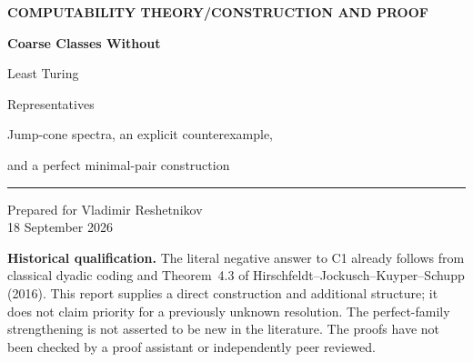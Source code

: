 \documentclass[11pt,a4paper]{article}
\newcommand{\nleT}{\nleq_{\mathrm T}}
\newcommand{\degT}{\operatorname{deg}_{\mathrm T}}
\newcommand{\zero}{\mathbf 0}
\newcommand{\ddeg}{\mathbf d}
\theoremstyle{definition}\newtheorem{definition}[theorem]{Definition}
\theoremstyle{remark}\newtheorem{remark}[theorem]{Remark}
\begin{document}
\begin{titlepage}
\vspace*{12mm}
{\small\sffamily\bfseries\color{navy}COMPUTABILITY THEORY\quad /\quad CONSTRUCTION AND PROOF\par}
\vspace{14mm}
{\Huge\bfseries\color{navy}Coarse Classes Without\par Least Turing\par Representatives\par}
\vspace{8mm}
{\Large Jump-cone spectra, an explicit counterexample,\par and a perfect minimal-pair construction\par}
\vspace{12mm}
\noindent\rule{\textwidth}{0.5pt}
\vspace{4mm}
\noindent Prepared for Vladimir Reshetnikov\\[3pt]
18 September 2026
\vspace{10mm}
\begin{abstract}
We attack C1 in the supplied Turing-degrees research catalogue: must every nonuniform coarse-equivalence class contain a least Turing degree? For the dyadic replication $R_A(n)=A(v_2(n+1))$, we prove that the actual representative spectrum, for either coarse reducibility, is precisely $\{\ddeg:\degT(A)\leq\ddeg'\}$. A finite-extension construction produces two coarse descriptions of $R_A$ with no common noncomputable information, and a synchronized version produces a perfect family of such descriptions. Consequently, when $A\nleT\varnothing'$, the coarse class has no least Turing degree. Taking $A=\varnothing''$ gives the high-degree spectrum; an explicit representative of this same coarse class has degree $\zero'$. In contrast, the effective-dense representative spectrum of $R_A$ is the ordinary upper cone above $\degT(A)$, and has a least element. All construction and spectrum arguments are proved here.
\end{abstract}
\vfill
\noindent\small\textbf{Historical qualification.} The literal negative answer to C1 already follows from classical dyadic coding and Theorem~4.3 of Hirschfeldt--Jockusch--Kuyper--Schupp (2016). This report supplies a direct construction and additional structure; it does not claim priority for a previously unknown resolution. The perfect-family strengthening is not asserted to be new in the literature. The proofs have not been checked by a proof assistant or independently peer reviewed.
\end{titlepage}
{\small\tableofcontents}
\newpage
\end{document}
